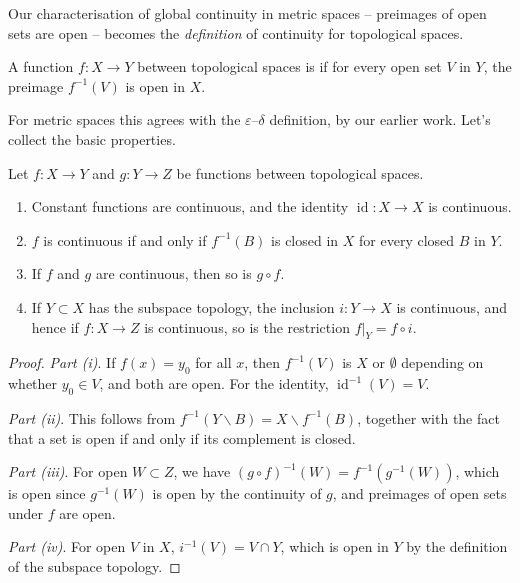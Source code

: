 \documentclass[a4paper]{scrartcl}
\begin{document}
Our characterisation of global continuity in metric spaces -- preimages of open sets are open -- becomes the \emph{definition} of continuity for topological spaces.

\begin{definition}[Continuity]
    A function $f: X \rightarrow Y$ between topological spaces is  if for every open set $V$ in $Y$, the preimage $f^{-1}(V)$ is open in $X$.
\end{definition}

For metric spaces this agrees with the $\varepsilon$--$\delta$ definition, by our earlier work. Let's collect the basic properties.

\begin{proposition}
    Let $f: X \rightarrow Y$ and $g: Y \rightarrow Z$ be functions between topological spaces.
    \begin{enumerate}[label=(\roman*)]
        \item Constant functions are continuous, and the identity $\operatorname{id}: X \rightarrow X$ is continuous.
        \item $f$ is continuous if and only if $f^{-1}(B)$ is closed in $X$ for every closed $B$ in $Y$.
        \item If $f$ and $g$ are continuous, then so is $g \circ f$.
        \item If $Y \subset X$ has the subspace topology, the inclusion $i: Y \rightarrow X$ is continuous, and hence if $f: X \rightarrow Z$ is continuous, so is the restriction $f|_Y = f \circ i$.
    \end{enumerate}
\end{proposition}
\begin{proof}
    \emph{Part (i)}. If $f(x) = y_0$ for all $x$, then $f^{-1}(V)$ is $X$ or $\emptyset$ depending on whether $y_0 \in V$, and both are open. For the identity, $\operatorname{id}^{-1}(V) = V$.

    \emph{Part (ii)}. This follows from $f^{-1}(Y \backslash B) = X \backslash f^{-1}(B)$, together with the fact that a set is open if and only if its complement is closed.

    \emph{Part (iii)}. For open $W \subset Z$, we have $(g \circ f)^{-1}(W) = f^{-1}(g^{-1}(W))$, which is open since $g^{-1}(W)$ is open by the continuity of $g$, and preimages of open sets under $f$ are open.

    \emph{Part (iv)}. For open $V$ in $X$, $i^{-1}(V) = V \cap Y$, which is open in $Y$ by the definition of the subspace topology.
\end{proof}
\end{document}
